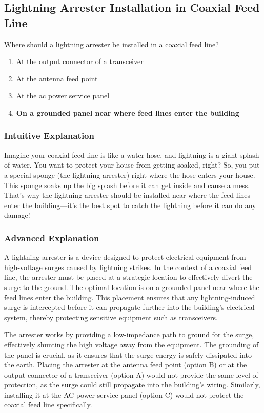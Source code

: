 \subsection{Lightning Arrester Installation in Coaxial Feed Line}
\label{T0A07}

\begin{tcolorbox}[colback=gray!10!white,colframe=black!75!black,title=T0A07]
Where should a lightning arrester be installed in a coaxial feed line?
\begin{enumerate}[label=\Alph*)]
    \item At the output connector of a transceiver
    \item At the antenna feed point
    \item At the ac power service panel
    \item \textbf{On a grounded panel near where feed lines enter the building}
\end{enumerate}
\end{tcolorbox}

\subsubsection{Intuitive Explanation}
Imagine your coaxial feed line is like a water hose, and lightning is a giant splash of water. You want to protect your house from getting soaked, right? So, you put a special sponge (the lightning arrester) right where the hose enters your house. This sponge soaks up the big splash before it can get inside and cause a mess. That’s why the lightning arrester should be installed near where the feed lines enter the building—it’s the best spot to catch the lightning before it can do any damage!

\subsubsection{Advanced Explanation}
A lightning arrester is a device designed to protect electrical equipment from high-voltage surges caused by lightning strikes. In the context of a coaxial feed line, the arrester must be placed at a strategic location to effectively divert the surge to the ground. The optimal location is on a grounded panel near where the feed lines enter the building. This placement ensures that any lightning-induced surge is intercepted before it can propagate further into the building’s electrical system, thereby protecting sensitive equipment such as transceivers.

The arrester works by providing a low-impedance path to ground for the surge, effectively shunting the high voltage away from the equipment. The grounding of the panel is crucial, as it ensures that the surge energy is safely dissipated into the earth. Placing the arrester at the antenna feed point (option B) or at the output connector of a transceiver (option A) would not provide the same level of protection, as the surge could still propagate into the building’s wiring. Similarly, installing it at the AC power service panel (option C) would not protect the coaxial feed line specifically.

